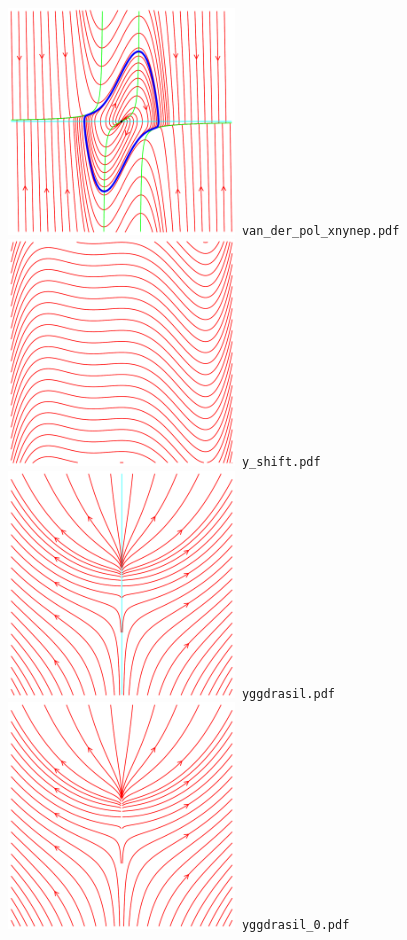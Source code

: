 \documentclass[a4paper]{amsart}
\begin{document}
\includegraphics[width=6cm]{van_der_pol_xnynep.pdf}\verb+ van_der_pol_xnynep.pdf+\\
\includegraphics[width=6cm]{y_shift.pdf}\verb+ y_shift.pdf+\\
\includegraphics[width=6cm]{yggdrasil.pdf}\verb+ yggdrasil.pdf+\\
\includegraphics[width=6cm]{yggdrasil_0.pdf}\verb+ yggdrasil_0.pdf+\\
\end{document}
